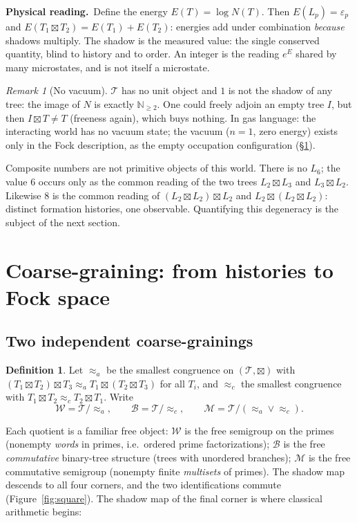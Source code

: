 \documentclass[11pt]{article}
\newcommand{\cT}{\mathcal{T}}   %
\newcommand{\cW}{\mathcal{W}}   %
\newcommand{\cB}{\mathcal{B}}   %
\newcommand{\cM}{\mathcal{M}}   %
\newcommand{\NN}{\mathbb{N}}
\newcommand{\physread}{\medskip\noindent\textbf{Physical reading.}\ }
\numberwithin{equation}{section}
\theoremstyle{plain}
\theoremstyle{definition}
\newtheorem{definition}[theorem]{Definition}
\theoremstyle{remark}
\newtheorem{remark}[theorem]{Remark}
\begin{document}
\physread Define the energy $E(T) = \log N(T)$. Then $E(L_p) = \varepsilon_p$ and
$E(T_1 \boxtimes T_2) = E(T_1) + E(T_2)$: energies add under combination
\emph{because} shadows multiply. The shadow is the measured value: the single
conserved quantity, blind to history and to order. An integer is the reading $e^{E}$
shared by many microstates, and is not itself a microstate.

\begin{remark}[No vacuum]\label{rem:nounit}
$\cT$ has no unit object and $1$ is not the shadow of any tree: the image of
$N$ is exactly $\NN_{\ge 2}$. One could freely adjoin an empty tree $I$, but then
$I \boxtimes T \neq T$ (freeness again), which buys nothing. In gas language: the
interacting world has no vacuum state; the vacuum ($n = 1$, zero energy) exists only
in the Fock description, as the empty occupation configuration
(\S\ref{sec:square}).
\end{remark}

Composite numbers are not primitive objects of this world. There is no $L_6$; the
value $6$ occurs only as the common reading of the two trees $L_2\boxtimes L_3$
and $L_3\boxtimes L_2$. Likewise $8$ is the common reading of
$(L_2\boxtimes L_2)\boxtimes L_2$ and $L_2\boxtimes(L_2\boxtimes L_2)$: distinct
formation histories, one observable. Quantifying this degeneracy is the subject of the
next section.

\section{Coarse-graining: from histories to Fock space}\label{sec:square}

\subsection{Two independent coarse-grainings}

\begin{definition}\label{def:congruences}
Let $\approx_a$ be the smallest congruence on $(\cT,\boxtimes)$ with
$(T_1\boxtimes T_2)\boxtimes T_3 \approx_a T_1\boxtimes(T_2\boxtimes T_3)$ for all
$T_i$, and $\approx_c$ the smallest congruence with
$T_1\boxtimes T_2 \approx_c T_2\boxtimes T_1$. Write
\[
\cW = \cT/\!\approx_a, \qquad
\cB = \cT/\!\approx_c, \qquad
\cM = \cT/(\approx_a \vee \approx_c).
\]
\end{definition}

Each quotient is a familiar free object: $\cW$ is the free semigroup on the primes
(nonempty \emph{words} in primes, i.e.\ ordered prime factorizations); $\cB$ is the
free \emph{commutative} binary-tree structure (trees with unordered branches); $\cM$
is the free commutative semigroup (nonempty finite \emph{multisets} of primes). The
shadow map descends to all four corners, and the two identifications commute
(Figure~\ref{fig:square}). The shadow map of the final corner is where classical
arithmetic begins:
\end{document}
